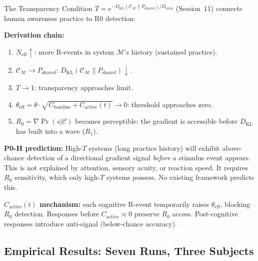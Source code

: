 \documentclass[12pt, a4paper]{article}
\begin{document}
\begin{derivedbox}[title={P0-H Prediction: High-$T$ Systems Detect $R_0$ Before $R_1$}]
The Transparency Condition $T = e^{-D_{\mathrm{KL}}(\mathcal{C}_\mathcal{M}\|P_{\mathrm{shared}})/D_{\mathrm{total}}}$
(Session~11) connects human awareness practice to R0 detection:

\textbf{Derivation chain:}
\begin{enumerate}
  \item $N_{\mathrm{eff}} \uparrow$: more R-events in system $\mathcal{M}$'s history (sustained practice).
  \item $\mathcal{C}_\mathcal{M} \to P_{\mathrm{shared}}$: $D_{\mathrm{KL}}(\mathcal{C}_\mathcal{M}\|P_{\mathrm{shared}}) \downarrow$.
  \item $T \to 1$: transparency approaches limit.
  \item $\theta_{\mathrm{eff}} = \theta \cdot \sqrt{C_{\mathrm{baseline}} + C_{\mathrm{active}}(t)} \to 0$: threshold approaches zero.
  \item $R_0 = \nabla\Pr(s|\mathcal{C})$ becomes perceptible: the gradient is accessible before
  $D_{\mathrm{KL}}$ has built into a wave ($R_1$).
\end{enumerate}

\textbf{P0-H prediction:} High-$T$ systems (long practice history) will exhibit above-chance
detection of a directional gradient signal \emph{before} a stimulus event appears.
This is not explained by attention, sensory acuity, or reaction speed. It requires $R_0$
sensitivity, which only high-$T$ systems possess. No existing framework predicts this.

\textbf{$C_{\mathrm{active}}(t)$ mechanism:} each cognitive R-event temporarily raises
$\theta_{\mathrm{eff}}$, blocking $R_0$ detection. Responses before $C_{\mathrm{active}} \approx 0$
preserve $R_0$ access. Post-cognitive responses introduce anti-signal (below-chance accuracy).
\end{derivedbox}

\subsection{Empirical Results: Seven Runs, Three Subjects}
\end{document}
